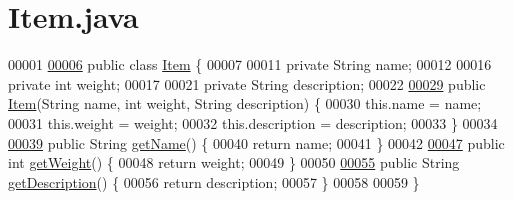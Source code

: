 \hypertarget{Item_8java_source}{\section{Item.\-java}
}

\begin{DoxyCode}
00001 
\hypertarget{Item_8java_source_l00006}{}\hyperlink{classItem}{00006} \textcolor{keyword}{public} \textcolor{keyword}{class }\hyperlink{classItem}{Item} \{
00007 
00011     \textcolor{keyword}{private} String name;
00012     
00016     \textcolor{keyword}{private} \textcolor{keywordtype}{int} weight;
00017 
00021     \textcolor{keyword}{private} String description;
00022 
\hypertarget{Item_8java_source_l00029}{}\hyperlink{classItem_acf7048ce82d4f6f047d926b1f6260f7c}{00029}     \textcolor{keyword}{public} \hyperlink{classItem_acf7048ce82d4f6f047d926b1f6260f7c}{Item}(String name, \textcolor{keywordtype}{int} weight, String description) \{
00030         this.name = name;
00031         this.weight = weight;
00032         this.description = description;
00033     \}
00034 
\hypertarget{Item_8java_source_l00039}{}\hyperlink{classItem_a78dd5a8370c5267c3f1f992167ab84ac}{00039}     \textcolor{keyword}{public} String \hyperlink{classItem_a78dd5a8370c5267c3f1f992167ab84ac}{getName}() \{
00040         \textcolor{keywordflow}{return} name;
00041     \}
00042 
\hypertarget{Item_8java_source_l00047}{}\hyperlink{classItem_a2ff9daec3cf9585fb5741062447a779d}{00047}     \textcolor{keyword}{public} \textcolor{keywordtype}{int} \hyperlink{classItem_a2ff9daec3cf9585fb5741062447a779d}{getWeight}() \{
00048         \textcolor{keywordflow}{return} weight;
00049     \}
00050 
\hypertarget{Item_8java_source_l00055}{}\hyperlink{classItem_abfe361bd046f5acdf4946bda076a8c8f}{00055}     \textcolor{keyword}{public} String \hyperlink{classItem_abfe361bd046f5acdf4946bda076a8c8f}{getDescription}() \{
00056         \textcolor{keywordflow}{return} description;
00057     \}
00058 
00059 \}
\end{DoxyCode}
